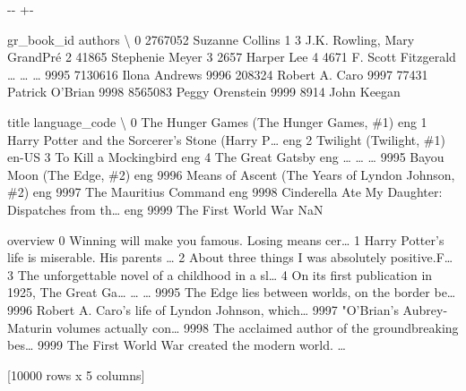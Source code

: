 \documentclass[letterpaper,10pt,english]{sphinxmanual}
\newlength\nbsphinxcodecellspacing
\begin{document}
{

\kern-\sphinxverbatimsmallskipamount\kern-\baselineskip
\kern+\FrameHeightAdjust\kern-\fboxrule
\vspace{\nbsphinxcodecellspacing}

\begin{sphinxVerbatim}[commandchars=\\\{\}]
\llap{\color{nbsphinxout}[16]:\,\hspace{\fboxrule}\hspace{\fboxsep}}      gr\_book\_id                      authors  \textbackslash{}
0        2767052              Suzanne Collins
1              3  J.K. Rowling, Mary GrandPré
2          41865              Stephenie Meyer
3           2657                   Harper Lee
4           4671          F. Scott Fitzgerald
{\ldots}          {\ldots}                          {\ldots}
9995     7130616                Ilona Andrews
9996      208324               Robert A. Caro
9997       77431              Patrick O'Brian
9998     8565083              Peggy Orenstein
9999        8914                  John Keegan

                                                  title language\_code  \textbackslash{}
0               The Hunger Games (The Hunger Games, \#1)           eng
1     Harry Potter and the Sorcerer's Stone (Harry P{\ldots}           eng
2                               Twilight (Twilight, \#1)         en-US
3                                 To Kill a Mockingbird           eng
4                                      The Great Gatsby           eng
{\ldots}                                                 {\ldots}           {\ldots}
9995                          Bayou Moon (The Edge, \#2)           eng
9996  Means of Ascent (The Years of Lyndon Johnson, \#2)           eng
9997                              The Mauritius Command           eng
9998  Cinderella Ate My Daughter: Dispatches from th{\ldots}           eng
9999                                The First World War           NaN

                                               overview
0     Winning will make you famous. Losing means cer{\ldots}
1     Harry Potter's life is miserable. His parents {\ldots}
2     About three things I was absolutely positive.F{\ldots}
3     The unforgettable novel of a childhood in a sl{\ldots}
4     On its first publication in 1925, The Great Ga{\ldots}
{\ldots}                                                 {\ldots}
9995  The Edge lies between worlds, on the border be{\ldots}
9996  Robert A. Caro's life of Lyndon Johnson, which{\ldots}
9997  "O'Brian's Aubrey-Maturin volumes actually con{\ldots}
9998  The acclaimed author of the groundbreaking bes{\ldots}
9999  The First World War created the modern world. {\ldots}

[10000 rows x 5 columns]
\end{sphinxVerbatim}
}
\end{document}
